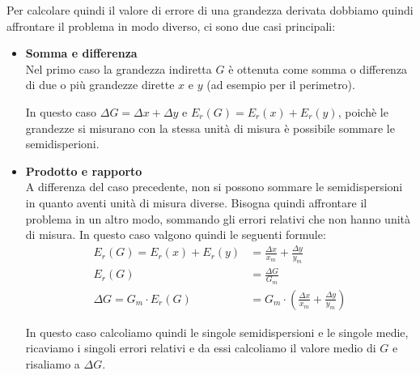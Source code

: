 \documentclass[../main.tex]{subfiles}
\begin{document}
Per calcolare quindi il valore di errore di una grandezza derivata dobbiamo quindi affrontare il problema in modo diverso, ci sono due casi principali:
\begin{itemize}
    \item \textbf{Somma e differenza} \\
    Nel primo caso la grandezza indiretta $G$ è ottenuta come somma o differenza di due o più grandezze dirette $x$ e $y$ (ad esempio per il perimetro). 

    In questo caso $\Delta G = \Delta x + \Delta y$ e $E_r(G) = E_r(x)+E_r(y)$, poichè le grandezze si misurano con la stessa unità di misura è possibile sommare le semidisperioni.

    \item \textbf{Prodotto e rapporto} \\
    A differenza del caso precedente, non si possono sommare le semidispersioni in quanto aventi unità di misura diverse. Bisogna quindi affrontare il problema in un altro modo, sommando gli errori relativi che non hanno unità di misura. In questo caso valgono quindi le seguenti formule:
    \begin{align*}
        E_r(G) = E_r(x) + E_r(y) &= \frac{\Delta x}{x_m}+\frac{\Delta y}{y_m} \\
        E_r(G) &= \frac{\Delta G}{G_m} \\
        \Delta G = G_m \cdot E_r(G) &= G_m \cdot (\frac{\Delta x}{x_m}+\frac{\Delta y}{y_m})
    \end{align*}

    In questo caso calcoliamo quindi le singole semidispersioni e le singole medie, ricaviamo i singoli errori relativi e da essi calcoliamo il valore medio di $G$ e risaliamo a $\Delta G$.
\end{itemize}
\end{document}
